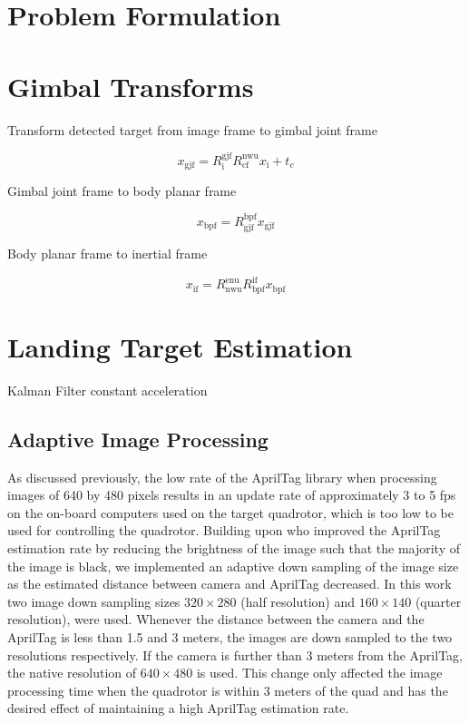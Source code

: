 \documentclass[letterpaper, 10 pt, conference]{ieeeconf}
\begin{document}
\section{Problem Formulation}


\section{Gimbal Transforms}

Transform detected target from image frame to gimbal joint frame

\begin{equation}
  x_{\text{gjf}} = R^{\text{gjf}}_{\text{i}} R^{\text{nwu}}_{\text{cf}} x_{\text{i}} + t_{c}
\end{equation}

Gimbal joint frame to body planar frame

\begin{equation}
  x_{\text{bpf}} = R^{\text{bpf}}_{\text{gjf}} x_{\text{gjf}}
\end{equation}

Body planar frame to inertial frame

\begin{equation}
  x_{\text{if}} = R^{\text{enu}}_{\text{nwu}} R^{\text{if}}_{\text{bpf}} x_{\text{bpf}}
\end{equation}


\section{Landing Target Estimation}

Kalman Filter constant acceleration

\subsection{Adaptive Image Processing}
As discussed previously, the low rate of the AprilTag library when processing
images of 640 by 480 pixels results in an update rate of approximately 3 to 5
fps on the on-board computers used on the target quadrotor, which is too low to
be used for controlling the quadrotor. Building upon who improved the AprilTag
estimation rate by reducing the brightness of the image  such that the majority
of the image is black, we implemented an adaptive down sampling of the image size
as the estimated distance between camera and AprilTag decreased. In this work
two image down sampling sizes $320 \times 280$ (half resolution) and $160
\times 140$ (quarter resolution), were used. Whenever the distance between the
camera and the AprilTag is less than 1.5 and 3 meters, the images are down
sampled to the two resolutions respectively. If the camera is further than 3
meters from the AprilTag, the native resolution of $640 \times 480$ is used.
This change only affected the image processing time when the quadrotor is
within 3 meters of the quad and has the desired effect of maintaining a high
AprilTag estimation rate.
\end{document}
